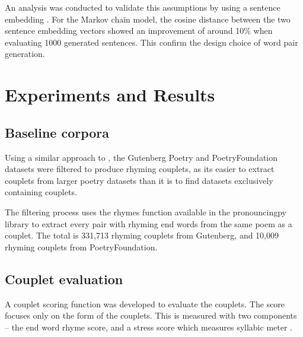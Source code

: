 \documentclass[11pt,a4paper]{article}
\begin{document}
An analysis was conducted to validate this assumptions by using a sentence embedding \cite{docvec}. For the Markov chain model, the cosine distance between the two sentence embedding vectors showed an improvement of around 10\% when evaluating 1000 generated sentences. This confirm the design choice of word pair generation.


\section{Experiments and Results}
\label{sec:results}

\subsection{Baseline corpora}
\label{sec:corpora}

Using a similar approach to \citet{cole}, the Gutenberg Poetry \cite{gutenbergpoetry} and PoetryFoundation \cite{poetryfoundationkaggle} datasets were filtered to produce rhyming couplets, as its easier to extract couplets from larger poetry datasets than it is to find datasets exclusively containing couplets.

The filtering process uses the rhymes function available in the pronouncingpy library to extract every pair with rhyming end words from the same poem as a couplet. The total is 331,713 rhyming couplets from Gutenberg, and 10,009 rhyming couplets from PoetryFoundation.

\subsection{Couplet evaluation}
\label{sec:coupleteval}

A couplet scoring function was developed to evaluate the couplets. The score focuses only on the form of the couplets. This is measured with two components -- the end word rhyme score, and a stress score which measures syllabic meter \cite{meter_def}.
\end{document}

